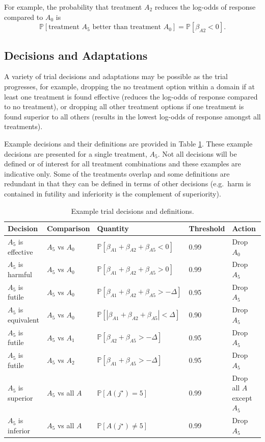 \documentclass[
]{article}
\begin{document}
For example, the probability that treatment \(A_2\) reduces the log-odds of response compared to \(A_0\) is
\[
\mathbb P[\text{treatment } A_5\text{ better than treatment } A_0] = \mathbb P[\beta_{A2}<0].
\]

\hypertarget{decisions-and-adaptations}{%
\subsection{Decisions and Adaptations}\label{decisions-and-adaptations}}

A variety of trial decisions and adaptations may be possible as the trial progresses, for example, dropping the no treatment option within a domain if at least one treatment is found effective (reduces the log-odds of response compared to no treatment), or dropping all other treatment options if one treatment is found superior to all others (results in the lowest log-odds of response amongst all treatments).

Example decisions and their definitions are provided in Table \ref{tab:dectab}.
These example decisions are presented for a single treatment, \(A_5\).
Not all decisions will be defined or of interest for all treatment combinations and these examples are indicative only.
Some of the treatments overlap and some definitions are redundant in that they can be defined in terms of other decisions (e.g.~harm is contained in futility and inferiority is the complement of superiority).

\begin{table}[H]

\caption{\label{tab:dectab}Example trial decisions and definitions.}
\centering
\begin{tabular}[t]{lllll}
\toprule
Decision & Comparison & Quantity & Threshold & Action\\
\midrule
$A_5$ is effective & $A_5$ vs $A_0$ & $\mathbb P[\beta_{A1}+\beta_{A2}+\beta_{A5}<0]$ & 0.99 & Drop $A_0$\\
$A_5$ is harmful & $A_5$ vs $A_0$ & $\mathbb P[\beta_{A1}+\beta_{A2}+\beta_{A5}>0]$ & 0.99 & Drop $A_5$\\
$A_5$ is futile & $A_5$ vs $A_0$ & $\mathbb P[\beta_{A1}+\beta_{A2}+\beta_{A5}>-\Delta]$ & 0.95 & Drop $A_5$\\
$A_5$ is equivalent & $A_5$ vs $A_0$ & $\mathbb P[|\beta_{A1}+\beta_{A2}+\beta_{A5}|<\Delta]$ & 0.90 & Drop $A_5$\\
$A_5$ is futile & $A_5$ vs $A_1$ & $\mathbb P[\beta_{A2}+\beta_{A5}>-\Delta]$ & 0.95 & Drop $A_5$\\
$A_5$ is futile & $A_5$ vs $A_2$ & $\mathbb P[\beta_{A1}+\beta_{A5}>-\Delta]$ & 0.95 & Drop $A_5$\\
$A_5$ is superior & $A_5$ vs all $A$ & $\mathbb P[A(j^\star)=5]$ & 0.99 & Drop all $A$ except $A_5$\\
$A_5$ is inferior & $A_5$ vs all $A$ & $\mathbb P[A(j^\star)\ne5]$ & 0.99 & Drop $A_5$\\
\bottomrule
\end{tabular}
\end{table}
\end{document}
